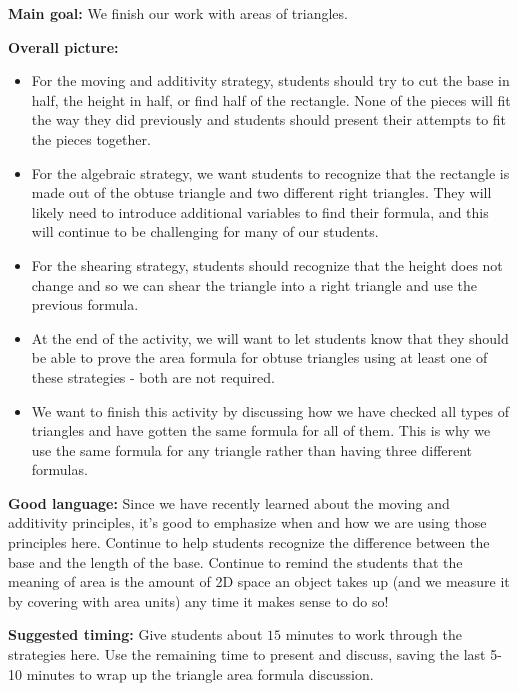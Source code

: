 \documentclass[nooutcomes,noauthor, handout]{ximera}
\begin{document}
\newpage

\begin{instructorNotes} 

{\bf Main goal:} We finish our work with areas of triangles.

{\bf Overall picture:} 
\begin{itemize}
	\item For the moving and additivity strategy, students should try to cut the base in half, the height in half, or find half of the rectangle. None of the pieces will fit the way they did previously and students should present their attempts to fit the pieces together.
	\item For the algebraic strategy, we want students to recognize that the rectangle is made out of the obtuse triangle and two different right triangles. They will likely need to introduce additional variables to find their formula, and this will continue to be challenging for many of our students.
	\item For the shearing strategy, students should recognize that the height does not change and so we can shear the triangle into a right triangle and use the previous formula. 
	\item At the end of the activity, we will want to let students know that they should be able to prove the area formula for obtuse triangles using at least one of these strategies - both are not required.
	\item We want to finish this activity by discussing how we have checked all types of triangles and have gotten the same formula for all of them. This is why we use the same formula for any triangle rather than having three different formulas.
\end{itemize}


{\bf Good language:} Since we have recently learned about the moving and additivity principles, it's good to emphasize when and how we are using those principles here. Continue to help students recognize the difference between the base and the length of the base. Continue to remind the students that the meaning of area is the amount of 2D space an object takes up (and we measure it by covering with area units) any time it makes sense to do so!



{\bf Suggested timing:} Give students about $15$ minutes to work through the strategies here. Use the remaining time to present and discuss, saving the last 5-10 minutes to wrap up the triangle area formula discussion.



\end{instructorNotes}
\end{document}
